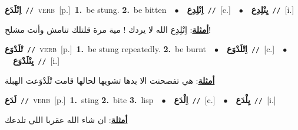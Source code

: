 \documentclass[10pt,a4paper,twoside]{article} %
\begin{document}
\begin{multicols}{2}
{\setlength\topsep{0pt}\textbf{\foreignlanguage{arabic}{اِنْلَدَع}}\ {\color{gray}\texttt{//}\color{black}}\ \textsc{verb}\ [p.]\ \textbf{1.}~be stung.  \textbf{2.}~be bitten\ \ $\bullet$\ \ \setlength\topsep{0pt}\textbf{\foreignlanguage{arabic}{اِنْلِدِع}}\ {\color{gray}\texttt{//}\color{black}}\ [c.]\ \ $\bullet$\ \ \setlength\topsep{0pt}\textbf{\foreignlanguage{arabic}{يِنْلِدِع}}\ {\color{gray}\texttt{//}\color{black}}\ [i.]\  \begin{flushright}\color{gray}\foreignlanguage{arabic}{\textbf{\underline{\foreignlanguage{arabic}{أمثلة}}}: اِنْلِدِع الله لا يردك ! مية مرة قلتلك تنامش وأنت مشلح!}\end{flushright}\color{black}} \vspace{2mm}

{\setlength\topsep{0pt}\textbf{\foreignlanguage{arabic}{تْلَدْوَع}}\ {\color{gray}\texttt{//}\color{black}}\ \textsc{verb}\ [p.]\ \textbf{1.}~be stung repeatedly.  \textbf{2.}~be burnt\ \ $\bullet$\ \ \setlength\topsep{0pt}\textbf{\foreignlanguage{arabic}{اِتْلَدْوَع}}\ {\color{gray}\texttt{//}\color{black}}\ [c.]\ \ $\bullet$\ \ \setlength\topsep{0pt}\textbf{\foreignlanguage{arabic}{يِتْلَدْوَع}}\ {\color{gray}\texttt{//}\color{black}}\ [i.]\  \begin{flushright}\color{gray}\foreignlanguage{arabic}{\textbf{\underline{\foreignlanguage{arabic}{أمثلة}}}: هي تفصحنت الا بدها تشويها لحالها قامت تْلَدْوَعت الهبلة}\end{flushright}\color{black}} \vspace{2mm}

{\setlength\topsep{0pt}\textbf{\foreignlanguage{arabic}{لَدَع}}\ {\color{gray}\texttt{//}\color{black}}\ \textsc{verb}\ [p.]\ \textbf{1.}~sting  \textbf{2.}~bite  \textbf{3.}~lisp\ \ $\bullet$\ \ \setlength\topsep{0pt}\textbf{\foreignlanguage{arabic}{اِلْدَع}}\ {\color{gray}\texttt{//}\color{black}}\ [c.]\ \ $\bullet$\ \ \setlength\topsep{0pt}\textbf{\foreignlanguage{arabic}{يِلْدَع}}\ {\color{gray}\texttt{//}\color{black}}\ [i.]\  \begin{flushright}\color{gray}\foreignlanguage{arabic}{\textbf{\underline{\foreignlanguage{arabic}{أمثلة}}}: ان شاء الله عقربا اللي تلدعك}\end{flushright}\color{black}} \vspace{2mm}


\end{multicols}
\end{document}

